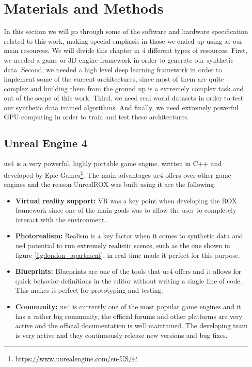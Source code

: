 
\chapter{Materials and Methods}
\label{metodologia}
In this section we will go through some of the software and hardware specification related to this work, making special emphasis in those we ended up using as our main resources. We will divide this chapter in 4 different types of resources. First, we needed a game or 3D engine framework in order to generate our synthetic data. Second, we needed a high level deep learning framework in order to implement some of the current architectures, since most of them are quite complex and building them from the ground up is a extremely complex task and out of the scope of this work. Third, we need real world datasets in order to test our synthetic data trained algorithms. And finally, we need extremely powerful GPU computing in order to train and test these architectures.

\section{Unreal Engine 4}
\gls{ue4} is a very powerful, highly portable game engine, written in C++ and developed by Epic Games\footnote{\url{https://www.unrealengine.com/en-US/}}.
The main advantages \gls{ue4} offers over other game engines and the reason UnrealROX was built using it are the following:

\begin{itemize}
	\item \textbf{Virtual reality support:} VR was a key point when developing the ROX framework since one of the main goals was to allow the user to completely interact with the environment.
	\item \textbf{Photorealism:} Realism is a key factor when it comes to synthetic data and \gls{ue4} potential to run extremely realistic scenes, such as the one shown in figure \ref{fig:london_apartment}, in real time made it perfect for this purpose.
	\item \textbf{Blueprints:} Blueprints are one of the tools that \gls{ue4} offers and it allows for quick behavior definitions in the editor without writing a single line of code. This makes it perfect for prototyping and testing.
	\item \textbf{Community:} \gls{ue4} is currently one of the most popular game engines and it has a rather big community, the official forums and other platforms are very active and the official documentation is well maintained. The developing team is very active and they continuously release new versions and bug fixes. 
\end{itemize}

